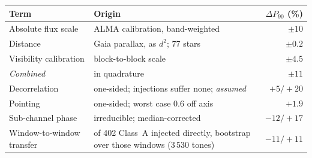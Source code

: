 \begin{tabular}{@{}l@{~}>{\raggedright\arraybackslash}p{}@{~}r@{}}
\hline
Term & Origin & $\Delta P_{90}$ (\%) \\
\hline
Absolute flux scale & ALMA calibration, band-weighted & $\pm10$ \\
Distance & Gaia parallax, as $d^{2}$; 77 stars & $\pm0.2$ \\
Visibility calibration & block-to-block scale & $\pm4.5$ \\
\hline
\emph{Combined} & in quadrature & $\pm11$ \\
\hline
Decorrelation & one-sided; injections suffer none; \emph{assumed} & $+5/+20$ \\
Pointing & one-sided; worst case 0.6\arcsec{} off axis & $+1.9$ \\
Sub-channel phase & irreducible; median-corrected & $-12/+17$ \\
Window-to-window transfer & 49 of 402 Class~A injected directly, bootstrap over those windows (3\,530 tones) & $-11/+11$ \\
\hline
\end{tabular}
